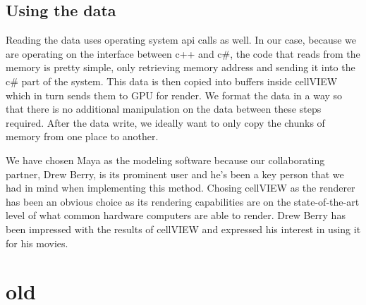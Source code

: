 \documentclass[
  digital, %
  table,   %
  nolof,     %
  nolot,     %
]{fithesis3}
\begin{document}
\subsection{Using the data}
Reading the data uses operating system api calls as well. In our case, because we are operating on the interface between c++ and c\#, the code that reads from the memory is pretty simple, only retrieving memory address and sending it into the c\# part of the system. This data is then copied into buffers inside cellVIEW which in turn sends them to GPU for render. We format the data in a way so that there is no additional manipulation on the data between these steps required. After the data write, we ideally want to only copy the chunks of memory from one place to another.

We have chosen Maya as the modeling software because our collaborating partner, Drew Berry, is its prominent user and he's been a key person that we had in mind when implementing this method. Chosing cellVIEW as the renderer has been an obvious choice as its rendering capabilities are on the state-of-the-art level of what common hardware computers are able to render. Drew Berry has been impressed with the results of cellVIEW and expressed his interest in using it for his movies.

\section{old}
\end{document}
